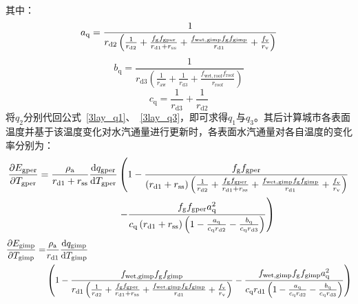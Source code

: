 其中：
\begin{equation}
  a_{\mathrm{q}}= \frac{1}{r_{\mathrm{d2}} \left( \frac{1}{r_{\mathrm{d2}}} + \frac{f_{\mathrm{g}} f_{\mathrm{gper}}}{r_{\mathrm{d1}} + r_{\mathrm{ss}}} + \frac{f_{\mathrm{wet,gimp}} f_{\mathrm{g}} f_{\mathrm{gimp}}}{r_{\mathrm{d1}}}+\frac{f_{\rm v}}{r_{\mathrm{v}}} \right)}
\end{equation}
%
\begin{equation}
  b_{\mathrm{q}} = \frac{1}{r_{\mathrm{d3}} \left( \frac{1}{r_{\mathrm{aw}}} + \frac{1}{r_{\mathrm{d3}}} + \frac{f_{\mathrm{wet,roof}} f_{\mathrm{roof}}}{r_{\mathrm{roof}}} \right)}
\end{equation}
%
\begin{equation}
  c_{\mathrm{q}} = \frac{1}{r_{\mathrm{d3}}} + \frac{1}{r_{\mathrm{d2}}}
\end{equation}
将$q_{2}$分别代回公式~\eqref{3lay_q1}、~\eqref{3lay_q3}，即可求得$q_{1}$与$q_{3}$。其后计算城市各表面温度并基于该温度变化对水汽通量进行更新时，各表面水汽通量对各自温度的变化率分别为：
\begin{equation}
  \begin{split}
    \frac{\partial  E_{\mathrm{gper}}}{\partial T_{\mathrm{gper}}} =\frac{\rho _{\rm a}}{r_{\mathrm{d1}}+r_{\mathrm{ss}}} \frac{{\mathrm {d}} q_{\mathrm{gper}}}{{\mathrm {d}} T_{\mathrm{gper}}} &\left(1-\frac{f_{\mathrm{g}}f_{\mathrm{gper}}}{\left(r_{\mathrm{d1}}+r_{\mathrm{ss}}\right) \left(\frac{1}{r_{\mathrm{d2}}} + \frac{f_{\mathrm{g}} f_{\mathrm{gper}}}{r_{\mathrm{d1}} + r_{\mathrm{ss}}} + \frac{f_{\mathrm{wet,gimp}} f_{\mathrm{g}} f_{\mathrm{gimp}}}{r_{\mathrm{d1}}}+\frac{f_{\rm v}}{r_{\mathrm{v}}}\right)}  \right. \\
    & \left. - \frac{f_{\mathrm{g}} f_{\mathrm{gper}} a_{\mathrm{q}}^2}{c_{\mathrm{q}}\left(r_{\mathrm{d1}}+r_{\mathrm{ss}}\right) \left( 1 - \frac{a_{\mathrm{q}}}{c_{\mathrm{q}} r_{\mathrm{d2}}} - \frac{b_{\mathrm{q}}}{c_{\mathrm{q}} r_{\mathrm{d3}}} \right)}\right)
  \end{split}
\end{equation}
%
\begin{equation}
  \begin{split}
    \frac{\partial  E_{\mathrm{gimp}}}{\partial T_{\mathrm{gimp}}} = &\frac{\rho _{\rm a}}{r_{\mathrm{d1}}} \frac{{\mathrm {d}} q_{\mathrm{gimp}}}{{\mathrm {d}} T_{\mathrm{gimp}}} \\
    &\left(1-\frac{f_{\mathrm{wet,gimp}}f_{\mathrm{g}}f_{\mathrm{gimp}}}{r_{\mathrm{d1}} \left(\frac{1}{r_{\mathrm{d2}}} + \frac{f_{\mathrm{g}} f_{\mathrm{gper}}}{r_{\mathrm{d1}} + r_{\mathrm{ss}}} + \frac{f_{\mathrm{wet,gimp}} f_{\mathrm{g}} f_{\mathrm{gimp}}}{r_{\mathrm{d1}}}+\frac{f_{\rm v}}{r_{\mathrm{v}}}\right)} - \frac{f_{\mathrm{wet,gimp}} f_{\mathrm{g}} f_{\mathrm{gimp}} a_{\mathrm{q}}^2}{c_{\mathrm{q}} r_{\mathrm{d1}}\left( 1 - \frac{a_{\mathrm{q}}}{c_{\mathrm{q}} r_{\mathrm{d2}}} - \frac{b_{\mathrm{q}}}{c_{\mathrm{q}} r_{\mathrm{d3}}} \right)}\right)
  \end{split}
\end{equation}
